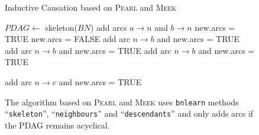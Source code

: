 \documentclass[twoside,twocolumn]{article}
\begin{document}
\begin{figure}
\begin{algorithm}[H]
\footnotesize
 \begin{algorithmic}[1]
     \caption{Inductive Causation  based on  \textsc{Pearl} and  \textsc{Meek}}
        \State $PDAG \gets $ skeleton($BN$) 
            					 	\State add arcs $a  \rightarrow n$ and $b \rightarrow n$   
					\EndIf
				\EndIf
			\EndFor
		\EndIf
	\EndFor
	\State new.arcs = TRUE 
		\State new.arcs = FALSE 
						\State add arc $n  \rightarrow b$ and new.arcs = TRUE  
					\EndIf
				\EndIf
					\State add arc $n  \rightarrow b$ and new.arcs = TRUE   
				\EndIf				
			\EndFor
			\EndIf
						\State add arc $n  \rightarrow b$ and new.arcs = TRUE   
					\EndIf
					
						\State add arc $n  \rightarrow c$  and new.arcs = TRUE   
					\EndIf
			\EndFor
			\EndIf
		\EndFor		
	\EndWhile
 \EndProcedure
  \end{algorithmic}
\end{algorithm} 
\caption[Inductive Causation algorithm]{The algorithm based on  \textsc{Pearl} and  \textsc{Meek} uses \texttt{bnlearn} methods  ``\texttt{skeleton}'', ``\texttt{neighbours}''  and ``\texttt{descendants}'' and only adds arcs if the PDAG remains acyclical. }
  \label{fig:causalalgorithm}
\end{figure}
\end{document}
